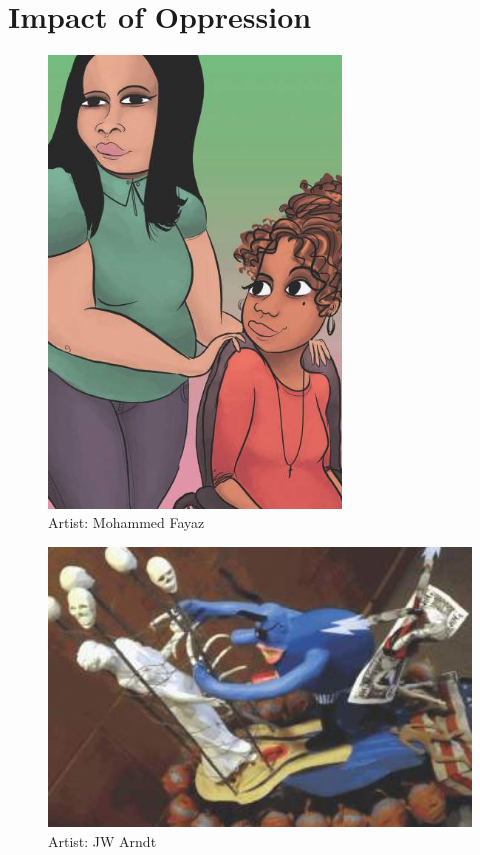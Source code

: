\chapter{Impact of Oppression}
\begin{figure}[h]
\centering
\includegraphics[height=12cm]{TeX_files/2-0.png}
\caption{Artist: Mohammed Fayaz}
\label{2-0}
\end{figure}


\newpage
\begin{figure}[h]
\centering
\includegraphics[width=16cm]{TeX_files/2-1.png}
\caption{Artist: JW Arndt}
\label{2-1}
\end{figure}

